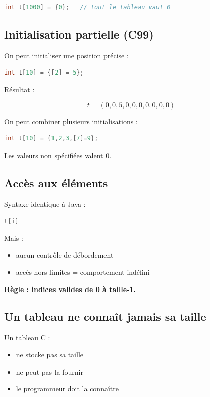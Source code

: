\begin{lstlisting}[language=C]
int t[1000] = {0};   // tout le tableau vaut 0
\end{lstlisting}

\subsection{Initialisation partielle (C99)}

On peut initialiser une position précise :

\begin{lstlisting}[language=C]
int t[10] = {[2] = 5};
\end{lstlisting}

Résultat :

\[
t = (0,0,5,0,0,0,0,0,0,0)
\]

On peut combiner plusieurs initialisations :

\begin{lstlisting}[language=C]
int t[10] = {1,2,3,[7]=9};
\end{lstlisting}

Les valeurs non spécifiées valent 0.

\subsection{Accès aux éléments}

Syntaxe identique à Java :

\begin{lstlisting}[language=C]
t[i]
\end{lstlisting}

Mais :

\begin{itemize}
    \item aucun contrôle de débordement
    \item accès hors limites = comportement indéfini
\end{itemize}

\textbf{Règle : indices valides de 0 à taille-1.}

\subsection{Un tableau ne connaît jamais sa taille}

Un tableau C :

\begin{itemize}
    \item ne stocke pas sa taille
    \item ne peut pas la fournir
    \item le programmeur doit la connaître
\end{itemize}

